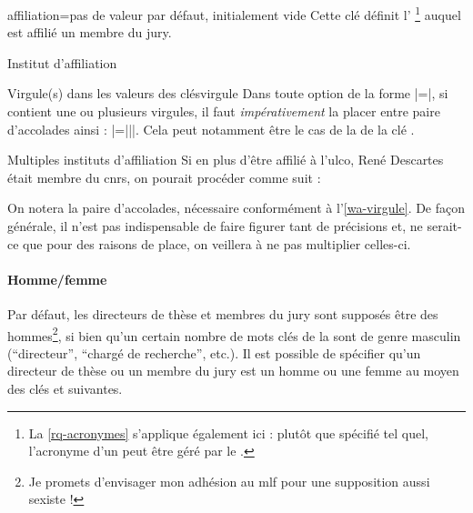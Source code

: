 \begin{docKey}{affiliation}{=}{pas de valeur par défaut,
    initialement vide}
  Cette clé définit l'%
  \footnote{La \vref{rq-acronymes} s'applique également ici : plutôt que
    spécifié tel quel, l'acronyme d'un  peut être géré par le
    .}  auquel est affilié un membre du jury.
\end{docKey}
\begin{dbexample}{Institut d'affiliation}{}
\begin{preamblecode}[listing options={deletekeywords={[5]supervisor}}]
\end{preamblecode}
\end{dbexample}
%
\begin{dbwarning}{Virgule(s) dans les valeurs des clés}{virgule}
  Dans toute option de la forme |=|, si 
  contient une ou plusieurs virgules, il faut \emph{impérativement} la placer
  entre paire d'accolades ainsi : |={||}|. Cela peut
  notamment être le cas de la  de la clé .
\end{dbwarning}
%
\begin{dbexample}{Multiples instituts d'affiliation}{}
  Si en plus d'être affilié à l'\gls{ulco}, René Descartes était membre du
  \gls{cnrs}, on pourait procéder comme suit :
\begin{preamblecode}
\end{preamblecode}
On notera la paire d'accolades, nécessaire conformément
à l'\vref{wa-virgule}. De façon générale, il n'est pas indispensable de faire
figurer tant de précisions et, ne serait-ce que pour des raisons de place, on
veillera à ne pas multiplier celles-ci.
\end{dbexample}

\paragraph{Homme/femme}
\label{sec-hommefemme}%
%
%

%
%
Par défaut, les directeurs de thèse et membres du jury sont supposés être des
hommes\footnote{Je promets d'envisager mon adhésion au \acrshort{mlf} pour une
  supposition aussi sexiste !}, si bien qu'un certain nombre de mots clés de la
\yatCl{} sont de genre masculin (\enquote{directeur}, \enquote{chargé de
  recherche}, etc.). Il est possible de spécifier qu'un directeur de thèse ou
un membre du jury est un homme ou une femme au moyen des clés  et
 suivantes.

